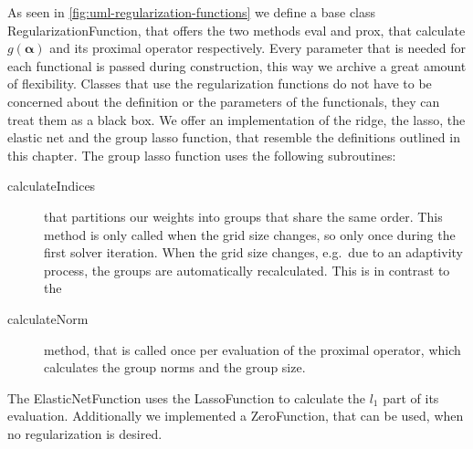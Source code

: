 \newcommand{\fistalb}{\\\phantom{+ solve(}}
\begin{figure}[htb]
\end{figure}

As seen in \cref{fig:uml-regularization-functions} we define a base class
RegularizationFunction, that offers the two methods eval and prox, that
calculate \(g(\bm{\alpha})\) and its proximal operator respectively.
Every parameter that is needed for each functional is passed during
construction, this way we archive a great amount of flexibility.
Classes that use the regularization functions do not have to be concerned about
the definition or the parameters of the functionals, they can treat them as a
black box.
We offer an implementation of the ridge, the lasso, the elastic net and the
group lasso function, that resemble the definitions outlined in this chapter.
The group lasso function uses the following subroutines:
\begin{description}
\item[calculateIndices] that partitions our weights into groups that share the
  same order. This method is only called when the grid size changes, so only
  once during the first solver iteration. When the grid size changes, e.g.~due
  to an adaptivity process, the groups are automatically recalculated. This is
  in contrast to the
\item[calculateNorm] method, that is called once per evaluation of the proximal
  operator, which calculates the group norms and the group size.
\end{description}
The ElasticNetFunction uses the LassoFunction to calculate the  \(l_1\) part of its evaluation.
Additionally we implemented a ZeroFunction, that can be used, when no
regularization is desired.

